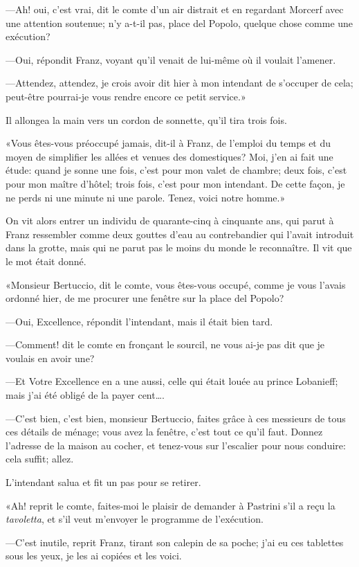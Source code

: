 —Ah! oui, c'est vrai, dit le comte d'un air distrait et en regardant Morcerf avec une attention soutenue; n'y a-t-il pas, place del Popolo, quelque chose comme une exécution? 

—Oui, répondit Franz, voyant qu'il venait de lui-même où il voulait l'amener. 

—Attendez, attendez, je crois avoir dit hier à mon intendant de s'occuper de cela; peut-être pourrai-je vous rendre encore ce petit service.» 

Il allongea la main vers un cordon de sonnette, qu'il tira trois fois. 

«Vous êtes-vous préoccupé jamais, dit-il à Franz, de l'emploi du temps et du moyen de simplifier les allées et venues des domestiques? Moi, j'en ai fait une étude: quand je sonne une fois, c'est pour mon valet de chambre; deux fois, c'est pour mon maître d'hôtel; trois fois, c'est pour mon intendant. De cette façon, je ne perds ni une minute ni une parole. Tenez, voici notre homme.» 

On vit alors entrer un individu de quarante-cinq à cinquante ans, qui parut à Franz ressembler comme deux gouttes d'eau au contrebandier qui l'avait introduit dans la grotte, mais qui ne parut pas le moins du monde le reconnaître. Il vit que le mot était donné. 

«Monsieur Bertuccio, dit le comte, vous êtes-vous occupé, comme je vous l'avais ordonné hier, de me procurer une fenêtre sur la place del Popolo? 

—Oui, Excellence, répondit l'intendant, mais il était bien tard. 

—Comment! dit le comte en fronçant le sourcil, ne vous ai-je pas dit que je voulais en avoir une? 

—Et Votre Excellence en a une aussi, celle qui était louée au prince Lobanieff; mais j'ai été obligé de la payer cent\dots. 

—C'est bien, c'est bien, monsieur Bertuccio, faites grâce à ces messieurs de tous ces détails de ménage; vous avez la fenêtre, c'est tout ce qu'il faut. Donnez l'adresse de la maison au cocher, et tenez-vous sur l'escalier pour nous conduire: cela suffit; allez. 

L'intendant salua et fit un pas pour se retirer. 

«Ah! reprit le comte, faites-moi le plaisir de demander à Pastrini s'il a reçu la \textit{tavoletta}, et s'il veut m'envoyer le programme de l'exécution. 

—C'est inutile, reprit Franz, tirant son calepin de sa poche; j'ai eu ces tablettes sous les yeux, je les ai copiées et les voici. 

